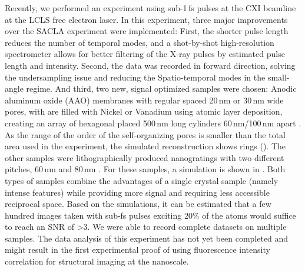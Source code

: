 Recently, we performed an experiment using sub-1\,fs pulses at the CXI beamline at the LCLS free electron laser. In this experiment, three major improvements over the SACLA experiment were implemented: First, the shorter pulse length reduces the number of temporal modes, and a shot-by-shot high-resolution spectrometer allows for better filtering of the X-ray pulses by estimated pulse length and intensity. Second, the data was recorded in forward direction, solving the undersampling issue and reducing the Spatio-temporal modes in the small-angle regime. And third, two new, signal optimized samples were chosen: Anodic aluminum oxide (AAO) membranes with regular spaced 20\,nm or 30\,nm wide pores, with are filled with Nickel or Vanadium using atomic layer deposition, creating an array of hexagonal placed 500\,nm long cylinders 60\,nm/100\,nm apart \cite{carina2019}. As the range of the order of the self-organizing pores is smaller than the total area used in the experiment, the simulated reconstruction shows rings ().  The other samples were lithographically produced nanogratings with two different pitches, 60\,nm  and 80\,nm \cite{mojarad2015}. For these samples, a simulation is shown in . Both types of samples combine the advantages of a single crystal sample (namely intense features) while providing more signal and requiring less accessible reciprocal space. 
Based on the simulations, it can be estimated that a few hundred images taken with sub-fs pulses exciting 20\% of the atoms would suffice to reach an SNR of >3.
We were able to record complete datasets on multiple samples. The data analysis of this experiment has not yet been completed and might result in the first experimental proof of using fluorescence intensity correlation for structural imaging at the nanoscale.  


